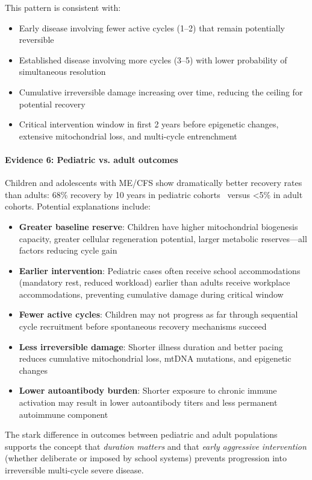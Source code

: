 This pattern is consistent with:
\begin{itemize}
    \item Early disease involving fewer active cycles (1--2) that remain potentially reversible
    \item Established disease involving more cycles (3--5) with lower probability of simultaneous resolution
    \item Cumulative irreversible damage increasing over time, reducing the ceiling for potential recovery
    \item Critical intervention window in first 2 years before epigenetic changes, extensive mitochondrial loss, and multi-cycle entrenchment
\end{itemize}

\paragraph{Evidence 6: Pediatric vs. adult outcomes}

Children and adolescents with ME/CFS show dramatically better recovery rates than adults: 68\% recovery by 10 years in pediatric cohorts~\cite{Rowe2019pediatric} versus <5\% in adult cohorts. Potential explanations include:
\begin{itemize}
    \item \textbf{Greater baseline reserve}: Children have higher mitochondrial biogenesis capacity, greater cellular regeneration potential, larger metabolic reserves---all factors reducing cycle gain
    \item \textbf{Earlier intervention}: Pediatric cases often receive school accommodations (mandatory rest, reduced workload) earlier than adults receive workplace accommodations, preventing cumulative damage during critical window
    \item \textbf{Fewer active cycles}: Children may not progress as far through sequential cycle recruitment before spontaneous recovery mechanisms succeed
    \item \textbf{Less irreversible damage}: Shorter illness duration and better pacing reduces cumulative mitochondrial loss, mtDNA mutations, and epigenetic changes
    \item \textbf{Lower autoantibody burden}: Shorter exposure to chronic immune activation may result in lower autoantibody titers and less permanent autoimmune component
\end{itemize}

The stark difference in outcomes between pediatric and adult populations supports the concept that \textit{duration matters} and that \textit{early aggressive intervention} (whether deliberate or imposed by school systems) prevents progression into irreversible multi-cycle severe disease.

